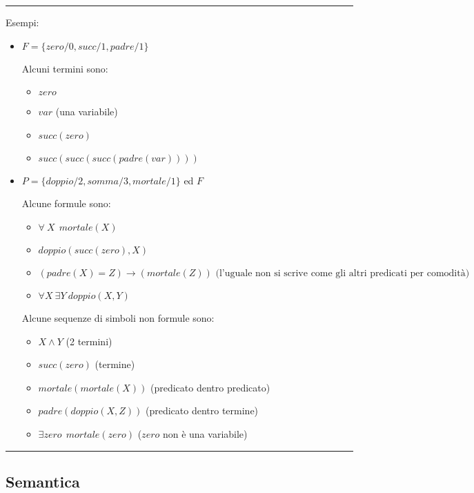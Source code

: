 \documentclass{article}
\begin{document}
\noindent\rule{\textwidth}{0.5pt}

\noindent Esempi:
\begin{itemize}
    \item $F=\{zero/0,succ/1,padre/1\}$

        Alcuni termini sono:
            \begin{itemize}
                \item $zero$
                \item $var$ (una variabile)
                \item $succ(zero)$
                \item $succ(succ(succ(padre(var))))$
            \end{itemize}

    \item $P=\{doppio/2,somma/3,mortale/1\}$ ed $F$

        Alcune formule sono:
            \begin{itemize}
                \item $\forall\ X\ \ mortale(X)$
                \item $doppio(succ(zero),X)$
                \item $(padre(X)=Z)\rightarrow(mortale(Z))\text{  (l'uguale non si scrive come gli altri predicati per comodità)}$ 
                \item $\forall X\ \exists Y \ doppio(X,Y)$\newline
            \end{itemize}

        Alcune sequenze di simboli non formule sono:
            \begin{itemize}
                \item $X\wedge Y$ (2 termini)
                \item $succ(zero)$ (termine)
                \item $mortale(mortale(X))$ (predicato dentro predicato)
                \item $padre(doppio(X,Z))$ (predicato dentro termine)
                \item $\exists zero \ \ mortale(zero)$ ($zero$ non è una variabile)
            \end{itemize}
\end{itemize}

\noindent\rule{\textwidth}{0.5pt}

\subsection{Semantica}
\end{document}
